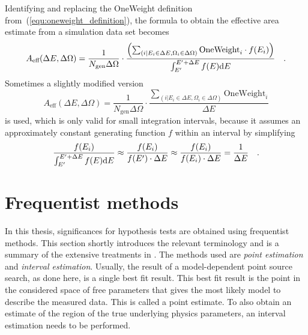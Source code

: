 Identifying and replacing the OneWeight definition from~(\ref{equ:oneweight_definition}), the formula to obtain the effective area estimate from a simulation data set becomes
\begin{equation}
  A_\text{eff}(\Delta E, \Delta \Omega) =
    \frac{1}{N_\text{gen}\Delta\Omega}\cdot
    \frac{\left(
            \sum_{(i|E_i\in\Delta E, \Omega_i\in\Delta\Omega)}
            \text{OneWeight}_i \cdot f(E_i)
          \right)}
          {\int_{E'}^{E'+\Delta E}f(E)\mathrm{d}E}
  \quad\text{.}
\end{equation}
Sometimes a slightly modified version
\begin{equation}
  A_\text{eff}(\Delta E, \Delta \Omega) =
    \frac{1}{N_\text{gen}\Delta\Omega}\cdot
    \frac{\sum_{(i|E_i\in\Delta E, \Omega_i\in\Delta\Omega)}
          \text{OneWeight}_i}
         {\Delta E}
\end{equation}
is used, which is only valid for small integration intervals, because it assumes an approximately constant generating function $f$ within an interval by simplifying
\begin{equation}
  \frac{f(E_i)}{\int_{E'}^{E'+\Delta E}f(E)\mathrm{d}E}
  \approx \frac{f(E_i)}{f(E')\cdot\Delta E}
  \approx \frac{f(E_i)}{f(E_i)\cdot\Delta E}
  = \frac{1}{\Delta E}
  \quad\text{.}
\end{equation}


\section{Frequentist methods}
  \label{chp:pointsource_frequentist}
In this thesis, significances for hypothesis tests are obtained using frequentist methods.
This section shortly introduces the relevant terminology and is a summary of the extensive treatments in \cite{casella2002statistical,blobel2013statistische,barlow1989statistics}.
The methods used are \emph{point estimation} and \emph{interval estimation}.
Usually, the result of a model-dependent point source search, as done here, is a single best fit result.
This best fit result is the point in the considered space of free parameters that gives the most likely model to describe the measured data.
This is called a point estimate.
To also obtain an estimate of the region of the true underlying physics parameters, an interval estimation needs to be performed.

